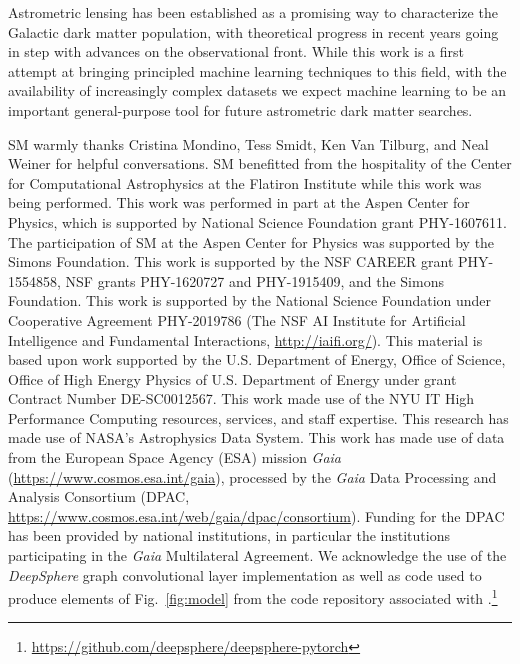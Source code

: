 \documentclass[twocolumn,linenumbers,anonymous]{aastex631}
\newcommand{\package}[1]{\textsl{#1}\xspace}
\newcommand{\deepsphere}{\package{DeepSphere}}
\begin{document}
Astrometric lensing has been established as a promising way to characterize the Galactic dark matter population, with theoretical progress in recent years going in step with advances on the observational front. While this work is a first attempt at bringing principled machine learning techniques to this field, with the availability of increasingly complex datasets we expect machine learning to be an important general-purpose tool for future astrometric dark matter searches.


\begin{acknowledgments}
SM warmly thanks Cristina Mondino, Tess Smidt, Ken Van Tilburg, and Neal Weiner for helpful conversations. SM benefitted from the hospitality of the Center for Computational Astrophysics at the Flatiron Institute while this work was being performed. 
This work was performed in part at the Aspen Center for Physics, which is supported by National Science Foundation grant PHY-1607611.
The participation of SM at the Aspen Center for Physics was supported by the Simons Foundation.
This work is supported by the NSF CAREER grant PHY-1554858, NSF grants PHY-1620727 and PHY-1915409, and the Simons Foundation. 
This work is supported by the National Science Foundation under Cooperative Agreement PHY-2019786 (The NSF AI Institute for Artificial Intelligence and Fundamental Interactions, \url{http://iaifi.org/}).
This material is based upon work supported by the U.S. Department of Energy, Office of Science, Office of High Energy Physics of U.S. Department of Energy under grant Contract Number DE-SC0012567.
This work made use of the NYU IT High Performance Computing resources, services, and staff expertise. 
This research has made use of NASA's Astrophysics Data System. 
This work has made use of data from the European Space Agency (ESA) mission {\it Gaia} (\url{https://www.cosmos.esa.int/gaia}), processed by the {\it Gaia} Data Processing and Analysis Consortium (DPAC, \url{https://www.cosmos.esa.int/web/gaia/dpac/consortium}). Funding for the DPAC has been provided by national institutions, in particular the institutions participating in the {\it Gaia} Multilateral Agreement. 
We acknowledge the use of the \deepsphere graph convolutional layer implementation as well as code used to produce elements of Fig.~\ref{fig:model} from the code repository associated with \citet{2020arXiv201215000D}.\footnote{\url{https://github.com/deepsphere/deepsphere-pytorch}}
\end{acknowledgments}
\end{document}
